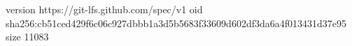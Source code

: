 version https://git-lfs.github.com/spec/v1
oid sha256:cb51ced429f6c06c927dbbb1a3d5b5683f33609d602df3da6a4f013431d37e95
size 11083
